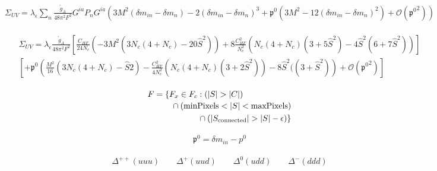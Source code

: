 \documentclass{article}
\newcommand{\bea}{\begin{eqnarray}}
\newcommand{\eea}{\end{eqnarray}}
\begin{document}
\bea
\Sigma_{UV}= \lambda_\epsilon \sum_{n}^{} \frac{\mathring{g}_A}{48\pi^2F^2} G^{ia} P_n G^{ia} \left(   3M^2(\delta m_{in}-\delta m_n) -2(\delta m_{in}-\delta m_n)^3 + \mathfrak{p^0} \left(  3M^2-12(\delta m_{in}-\delta m_n)^2 \right) + \mathcal{O} \left( \mathfrak{p^0}^2 \right) \right)
\eea


\bea
\begin{multlined}
\Sigma_{UV}=  \lambda_\epsilon  \frac{\mathring{g}_A}{48\pi^2F^2} 
	 \left[   \frac{C_{HF}}{24N_c} 	\left(  -3M^2 (3N_c (4+N_c) -20 \hat{S}^2  )   \right) 
		+ 8 \frac{C_{HF}^2}{N_c^2} (N_c(4+N_c)(3+5 \hat{S}^2) -4 \hat{S}^2(6+7 \hat{S}^2) ) \right ] \\	
	\left[	+ \mathfrak{p^0} \left( \frac{M^2}{16} (3N_c (4+N_c)-\hat{S}2)
		- \frac{C_{HF}^2}{4N_c^2}(N_c(4+N_c)(3+2 \hat{S}^2))
		-8	\hat{S}^2 ((3+\hat{S}^2)  \right) + \mathcal{O} \left( \mathfrak{p^0}^2 \right)
	\right ]
\end{multlined}
\eea



\begin{equation}
\begin{multlined}
F = \{F_{x} \in  F_{c} : (|S| > |C|) \\
\shoveleft[1cm]{\cap (\mathrm{minPixels}  < |S| < \mathrm{maxPixels})} \\
\cap (|S_{\mathrm{connected}}| > |S| - \epsilon) \}
\end{multlined}
\end{equation}


\bea
 \mathfrak{p^0}=\delta m_{in}-p^0
\eea

\bea
\Delta^{++}\left( uuu \right) \qquad \Delta^{+}\left( uud \right) \qquad \Delta^{0}\left( udd \right) \qquad \Delta^{-}\left( ddd \right)
\eea

\newpage


 
%
\end{document}
